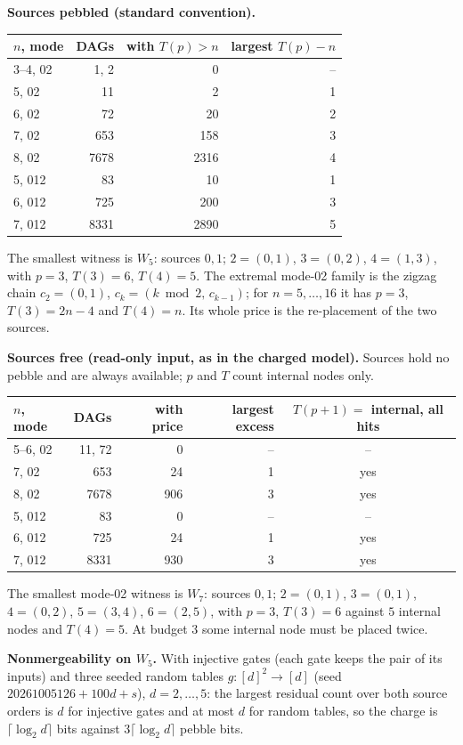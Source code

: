 \documentclass[11pt]{article}
\begin{document}
\textbf{Sources pebbled (standard convention).}
\begin{center}\begin{tabular}{lrrr}\toprule
$n$, mode & DAGs & with $T(p)>n$ & largest $T(p)-n$\\\midrule
3--4, 02 & 1, 2 & 0 & --\\
5, 02 & 11 & 2 & 1\\
6, 02 & 72 & 20 & 2\\
7, 02 & 653 & 158 & 3\\
8, 02 & 7678 & 2316 & 4\\
5, 012 & 83 & 10 & 1\\
6, 012 & 725 & 200 & 3\\
7, 012 & 8331 & 2890 & 5\\\bottomrule
\end{tabular}\end{center}
The smallest witness is $W_5$: sources $0,1$; $2=(0,1)$, $3=(0,2)$, $4=(1,3)$, with $p=3$, $T(3)=6$, $T(4)=5$. The extremal mode-02 family is the zigzag chain $c_2=(0,1)$, $c_k=(k\bmod2,\,c_{k-1})$; for $n=5,\dots,16$ it has $p=3$, $T(3)=2n-4$ and $T(4)=n$. Its whole price is the re-placement of the two sources.

\textbf{Sources free (read-only input, as in the charged model).} Sources hold no pebble and are always available; $p$ and $T$ count internal nodes only.
\begin{center}\begin{tabular}{lrrrc}\toprule
$n$, mode & DAGs & with price & largest excess & $T(p+1)=$ internal, all hits\\\midrule
5--6, 02 & 11, 72 & 0 & -- & --\\
7, 02 & 653 & 24 & 1 & yes\\
8, 02 & 7678 & 906 & 3 & yes\\
5, 012 & 83 & 0 & -- & --\\
6, 012 & 725 & 24 & 1 & yes\\
7, 012 & 8331 & 930 & 3 & yes\\\bottomrule
\end{tabular}\end{center}
The smallest mode-02 witness is $W_7$: sources $0,1$; $2=(0,1)$, $3=(0,1)$, $4=(0,2)$, $5=(3,4)$, $6=(2,5)$, with $p=3$, $T(3)=6$ against $5$ internal nodes and $T(4)=5$. At budget $3$ some internal node must be placed twice.

\textbf{Nonmergeability on $W_5$.} With injective gates (each gate keeps the pair of its inputs) and three seeded random tables $g:[d]^2\to[d]$ (seed $20261005126+100d+s$), $d=2,\dots,5$: the largest residual count over both source orders is $d$ for injective gates and at most $d$ for random tables, so the charge is $\lceil\log_2d\rceil$ bits against $3\lceil\log_2d\rceil$ pebble bits.
\end{document}
